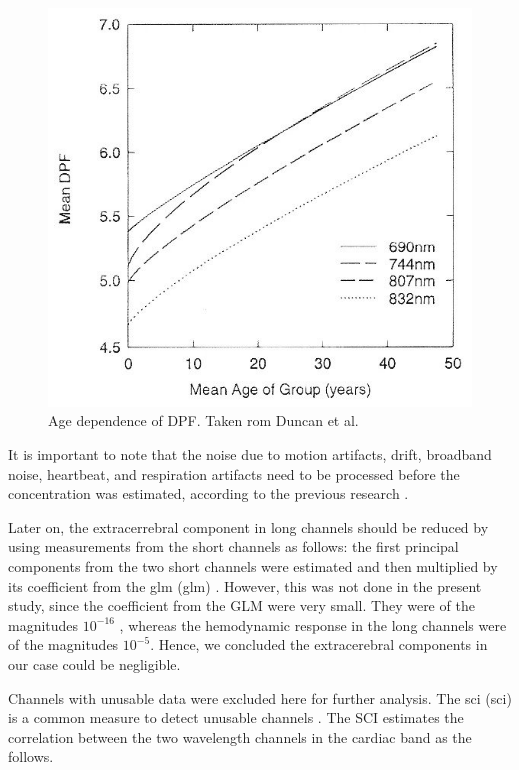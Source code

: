 \begin{figure}[H]
  \centering
    \includegraphics[scale=.45]{bilder/fig3_duncan.jpg}
  \caption{Age dependence of DPF. Taken rom Duncan et al. \citeyearpar{Duncan1996MeasurementOC} }
  \label{fig:somesignal}
\end{figure}

It is important to note that the noise due to motion artifacts, drift, broadband noise, heartbeat, and respiration artifacts need to be processed before the concentration was estimated, according to the previous research \citep {Huppert:09}.

Later on, the extracerrebral component in long channels should be reduced by using measurements from the short channels as follows: the first principal components from the two short channels were estimated and then multiplied by its coefficient from the \acrlong{glm} (\acrshort {glm}) \citep{friston1994statistical}. However, this was not done in the present study, since the coefficient from the GLM were very small. They were of the magnitudes $10^{-16}$ , whereas the hemodynamic response in the long channels were of the magnitudes $10^{-5}$. Hence, we concluded the extracerebral components in our case could be negligible.

Channels with unusable data were excluded here for further analysis. The \acrlong{sci} (\acrshort{sci}) \citep {Pollonini2013} is a common measure to detect unusable channels . The SCI estimates the correlation between the two wavelength channels in the cardiac band as the follows.

